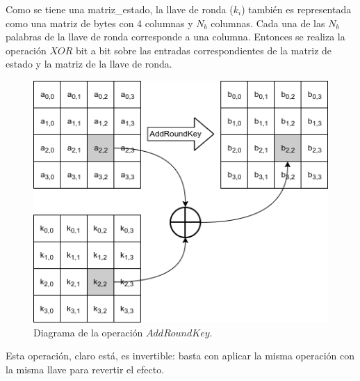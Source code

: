 Como se tiene una matriz\_estado, la llave de ronda ($k_i$) también
es representada como una matriz de bytes con 4 columnas y $N_b$ columnas.
Cada una de las $N_b$ palabras de la llave de ronda corresponde a una
columna. Entonces se realiza la operación $XOR$ bit a bit sobre las
entradas correspondientes de la matriz de estado y la matriz de la llave
de ronda.

\begin{figure}[H]
  \begin{center}
    \includegraphics[width=0.6\linewidth]
      {contenidos/antecedentes/bloques/diagramas/addRoundKey}
     \caption{Diagrama de la operación $AddRoundKey$.}
   \end{center}
\end{figure}

Esta operación, claro está, es invertible: basta con aplicar la misma
operación con la misma llave para revertir el efecto.
